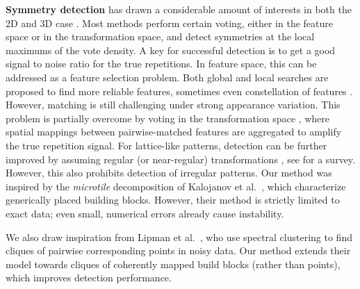 \documentclass{acmtog}
\begin{document}
\textbf{Symmetry detection} has drawn a considerable amount of interests in both the 2D \cite{Lee2009SR,Wu2010DL} and 3D case \cite{Mitra2006PAA,Pauly2008,LIPMANsig2010,HuangMesh2013}. Most methods perform certain voting, either in the feature space or in the transformation space, and detect symmetries at the local maximums of the vote density. A key for successful detection is to get a good signal to noise ratio for the true repetitions. In feature space, this can be addressed as a feature selection problem. Both global \cite{Wang2008Factor,Agrawal2012RI,Bokeloh2009SD} and local \cite{Leung1996} searches are proposed to find more reliable features, sometimes even constellation of features \cite{Liu2013GRASP}.
%
However, matching is still challenging under strong appearance variation. This problem is partially overcome by voting in the transformation space \cite{Hays2006Texture,Mitra2006PAA}, where spatial mappings between pairwise-matched features are aggregated to amplify the true repetition signal. For lattice-like patterns, detection can be further improved by assuming regular (or near-regular) transformations \cite{Pauly2008,Wu2010DL,Zhao2011TS,Tai2012PF}, see \cite{Lin2006Eva} for a survey.
%
However, this also prohibits detection of irregular patterns. Our method was inspired by the \emph{microtile} decomposition of Kalojanov et al.~, which characterize generically placed building blocks. However, their method is strictly limited to exact data; even small, numerical errors already cause instability.

We also draw inspiration from Lipman et al.~\cite{LIPMANsig2010}, who use spectral clustering to find cliques of pairwise corresponding points in noisy data. Our method extends their model towards cliques of coherently mapped build blocks (rather than points), which improves detection performance.
\end{document}
